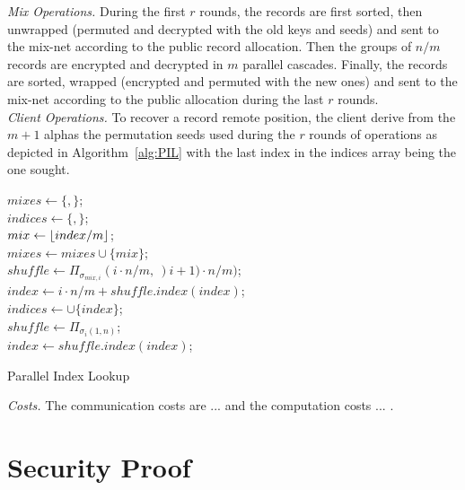 \documentclass[USenglish,oneside,twocolumn]{article}
\DeclarePairedDelimiter\floor{\lfloor}{\rfloor}
\begin{document}
\noindent\textit{Mix Operations.} During the first $r$ rounds, the records are first sorted, then  unwrapped (permuted and decrypted with the old keys and seeds) and sent to the mix-net according to the public record allocation. Then the groups of $n/m$ records are encrypted and decrypted in $m$ parallel cascades. Finally, the records are sorted, wrapped (encrypted and permuted with the new ones) and sent to the mix-net according to the public allocation during the last $r$ rounds.\\

\noindent\textit{Client Operations.} To recover a record remote position, the client derive from the $m+1$ alphas the permutation seeds used during the $r$ rounds of operations as depicted in Algorithm~\ref{alg:PIL} with the last index in the indices array being the one sought.\\

\begin{algorithm}
\DontPrintSemicolon
{}
$mixes \gets \{,\}$;\\
$indices \gets \{,\}$;\\
{
	$mix \gets \floor{index/m}$;\\
	$mixes \gets mixes \cup \{mix \}$;\\
	$shuffle \gets {\Pi}_{\sigma_{mix,i}}(i\cdot n / m,\ )i+1)\cdot n / m)$;\\
	$index \gets i\cdot n/m + shuffle.index(index)$;\\
	$indices \gets \cup \{index\}$;\\
	$shuffle \gets {\Pi}_{\sigma_{i}(1,n)}$;\\
	$index \gets shuffle.index(index)$;\\
}
\caption{Parallel Index Lookup}
\label{alg:PIL}
\end{algorithm}

\noindent\textit{Costs.} The communication costs are ... and the computation costs ... .\\

\section{Security Proof}\label{Security}
\end{document}
